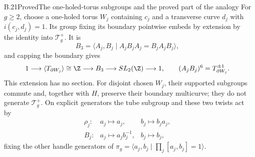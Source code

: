 \begin{claim}{B.21}{Proved}{The one-holed-torus subgroups and the proved part of the analogy}
For $g\ge2$, choose a one-holed torus $W_j$ containing $c_j$ and a transverse curve $d_j$
with $i(c_j,d_j)=1$. Its group fixing its boundary pointwise embeds by extension
by the identity into $\mathcal T_g^+$. It is
\[
 B_3=\langle A_j,B_j\mid A_jB_jA_j=B_jA_jB_j\rangle,
\]
and capping the boundary gives
\[
 1\longrightarrow\langle T_{\partial W_j}\rangle\cong\Z
 \longrightarrow B_3\longrightarrow SL_2(\Z)\longrightarrow1,
 \qquad (A_jB_j)^6=T_{\partial W_j}^{\pm1}.
\]
This extension has no section. For disjoint chosen $W_j$, their supported
subgroups commute and, together with $H$, preserve their boundary multicurve;
they do not generate $\mathcal T_g^+$. On explicit generators the tube subgroup
and these two twists act by
\[
 \begin{array}{lll}
 \rho_j:&a_j\mapsto a_j,&b_j\mapsto b_ja_j,\\
 B_j:&a_j\mapsto a_jb_j^{-1},&b_j\mapsto b_j,
 \end{array}
\]
fixing the other handle generators of
$\pi_g=\langle a_j,b_j\mid\prod_j[a_j,b_j]=1\rangle$.
\end{claim}
